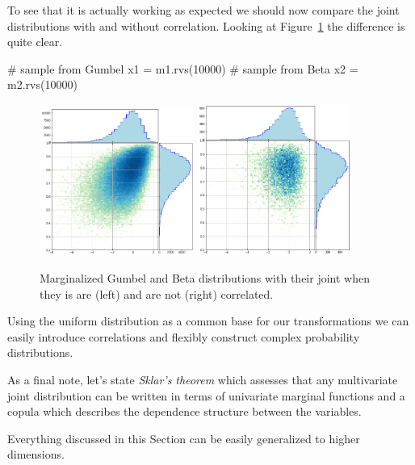 To see that it is actually working as expected we should now compare the joint distributions with and without correlation. Looking at Figure~\ref{fig:gumbel_beta_with_corr} the difference is quite clear.

\begin{ipython}
# sample from Gumbel
x1 = m1.rvs(10000)
# sample from Beta
x2 = m2.rvs(10000)
\end{ipython}

\begin{figure}[htbp]
  \centering
  \includegraphics[width=0.45\textwidth]{figures/gumbel_vs_beta}
  \quad
  \includegraphics[width=0.45\textwidth]{figures/gumbel_vs_beta_corr}
  \caption{Marginalized Gumbel and Beta distributions with their joint when they is are (left) and are not (right) correlated.}
  \label{fig:gumbel_beta_with_corr}
\end{figure}
    
Using the uniform distribution as a common base for our transformations we can easily introduce correlations and flexibly construct complex probability distributions. 

As a final note, let's state \emph{Sklar's theorem} which assesses that any multivariate joint distribution can be written in terms of univariate marginal functions and a copula which describes the dependence structure between the variables.

Everything discussed in this Section can be easily generalized to higher dimensions.

